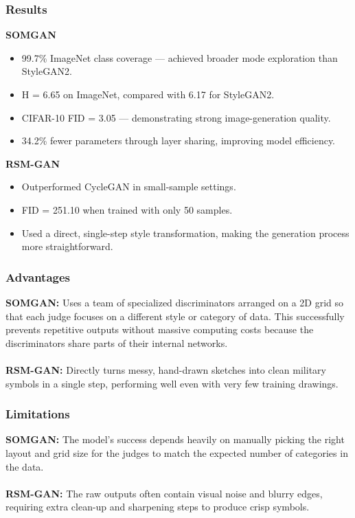 \documentclass[12pt,a4paper]{article}
\begin{document}
\subsubsection{Results}
\textbf{SOMGAN}
\begin{itemize}
    \item 99.7\% ImageNet class coverage — achieved broader mode exploration than StyleGAN2.
    \item H = 6.65 on ImageNet, compared with 6.17 for StyleGAN2.
    \item CIFAR-10 FID = 3.05 — demonstrating strong image-generation quality.
    \item 34.2\% fewer parameters through layer sharing, improving model efficiency.
\end{itemize}

\textbf{RSM-GAN}
\begin{itemize}
    \item Outperformed CycleGAN in small-sample settings.
    \item FID = 251.10 when trained with only 50 samples.
    \item Used a direct, single-step style transformation, making the generation process more straightforward.
\end{itemize}

\subsubsection{Advantages}
\textbf{SOMGAN:} Uses a team of specialized discriminators arranged on a 2D grid so that each judge focuses on a different style or category of data. This successfully prevents repetitive outputs without massive computing costs because the discriminators share parts of their internal networks. \\
\\ \textbf{RSM-GAN:} Directly turns messy, hand-drawn sketches into clean military symbols in a single step, performing well even with very few training drawings.

\subsubsection{Limitations}
\textbf{SOMGAN:} The model’s success depends heavily on manually picking the right layout and grid size for the judges to match the expected number of categories in the data. \\
\\ \textbf{RSM-GAN:} The raw outputs often contain visual noise and blurry edges, requiring extra clean-up and sharpening steps to produce crisp symbols.
\end{document}

